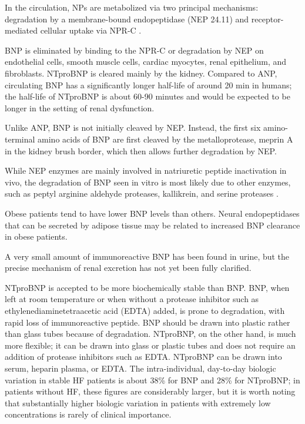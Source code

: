 \documentclass[14pt,a4paper,onecolumn]{extarticle}
\begin{document}
In the circulation, NPs are metabolized via two principal mechanisms: degradation by a membrane-bound endopeptidase (NEP 24.11) and receptor-mediated cellular uptake via NPR-C \citep{14}.

BNP is eliminated by binding to the NPR-C or degradation by NEP on endothelial cells, smooth muscle cells, cardiac myocytes, renal epithelium, and fibroblasts. NTproBNP is cleared mainly by the kidney. Compared to ANP, circulating BNP has a significantly longer half-life of around 20 min in humans; the half-life of NTproBNP is about 60-90 minutes and would be expected to be longer in the setting of renal dysfunction. \citep{Pankow2007}

Unlike ANP, BNP is not initially cleaved by NEP. Instead, the first six amino-terminal amino acids of BNP are first cleaved by the metalloprotease, meprin A in the kidney brush border, which then allows further degradation by NEP. \citep{Pankow2007}

While NEP enzymes are mainly involved in natriuretic peptide inactivation in vivo, the degradation of BNP seen in vitro is most likely due to other enzymes, such as peptyl arginine aldehyde proteases, kallikrein, and serine proteases \citep{15}.

Obese patients tend to have lower BNP levels than others. Neural endopeptidases that can be secreted by adipose tissue may be related to increased BNP clearance in obese patients. \citep{Yang2004}

A very small amount of immunoreactive BNP has been found in urine, but the precise mechanism of renal excretion has not yet been fully clarified. \citep{203}

NTproBNP is accepted to be more biochemically stable than BNP. BNP, when left at room temperature or when without a protease inhibitor such as ethylenediaminetetraacetic acid (EDTA) added, is prone to degradation, with rapid loss of immunoreactive peptide. BNP should be drawn into plastic rather than glass tubes because of degradation. NTproBNP, on the other hand, is much more flexible; it can be drawn into glass or plastic tubes and does not require an addition of protease inhibitors such as EDTA. NTproBNP can be drawn into serum, heparin plasma, or EDTA. The intra-individual, day-to-day biologic variation in stable HF patients is about 38\% for BNP and 28\% for NTproBNP; in patients without HF, these figures are considerably larger, but it is worth noting that substantially higher biologic variation in patients with extremely low concentrations is rarely of clinical importance. \citep{Gaggin2014} %
\end{document}

